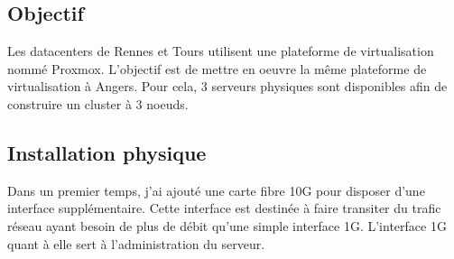 \documentclass[12pt, a4paper, twoside]{article}
\begin{document}
\subsection{Objectif}
Les datacenters de Rennes et Tours utilisent une plateforme de virtualisation nommé \gls{Proxmox}. 
L'objectif est de mettre en oeuvre la même plateforme de virtualisation à Angers. 
Pour cela, 3 serveurs physiques sont disponibles afin de construire un \gls{cluster} à 3 noeuds.

\subsection{Installation physique}
Dans un premier temps, j'ai ajouté une carte fibre 10G pour disposer d'une interface supplémentaire. 
Cette interface est destinée à faire transiter du trafic réseau ayant besoin de plus de débit qu'une simple interface 1G. 
L'interface 1G quant à elle sert à l'administration du serveur.
\end{document}
